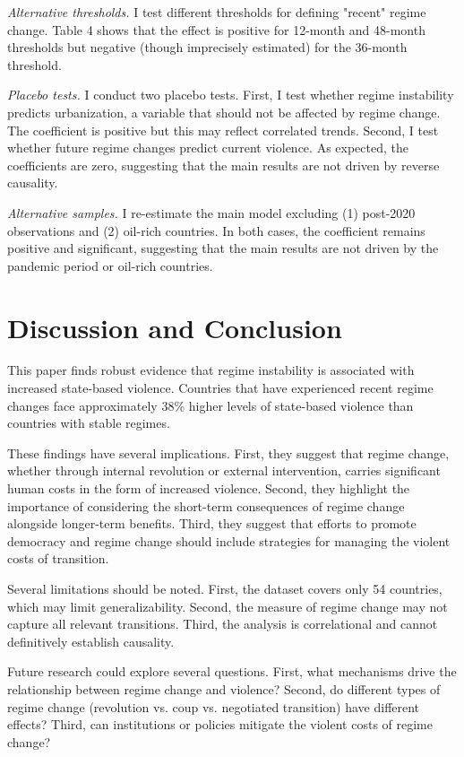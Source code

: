 \documentclass[12pt]{article}
\begin{document}
\textit{Alternative thresholds.} I test different thresholds for defining "recent" regime change. Table 4 shows that the effect is positive for 12-month and 48-month thresholds but negative (though imprecisely estimated) for the 36-month threshold.

\textit{Placebo tests.} I conduct two placebo tests. First, I test whether regime instability predicts urbanization, a variable that should not be affected by regime change. The coefficient is positive but this may reflect correlated trends. Second, I test whether future regime changes predict current violence. As expected, the coefficients are zero, suggesting that the main results are not driven by reverse causality.

\textit{Alternative samples.} I re-estimate the main model excluding (1) post-2020 observations and (2) oil-rich countries. In both cases, the coefficient remains positive and significant, suggesting that the main results are not driven by the pandemic period or oil-rich countries.

\section{Discussion and Conclusion}

This paper finds robust evidence that regime instability is associated with increased state-based violence. Countries that have experienced recent regime changes face approximately 38\% higher levels of state-based violence than countries with stable regimes.

These findings have several implications. First, they suggest that regime change, whether through internal revolution or external intervention, carries significant human costs in the form of increased violence. Second, they highlight the importance of considering the short-term consequences of regime change alongside longer-term benefits. Third, they suggest that efforts to promote democracy and regime change should include strategies for managing the violent costs of transition.

Several limitations should be noted. First, the dataset covers only 54 countries, which may limit generalizability. Second, the measure of regime change may not capture all relevant transitions. Third, the analysis is correlational and cannot definitively establish causality.

Future research could explore several questions. First, what mechanisms drive the relationship between regime change and violence? Second, do different types of regime change (revolution vs. coup vs. negotiated transition) have different effects? Third, can institutions or policies mitigate the violent costs of regime change?
\end{document}
